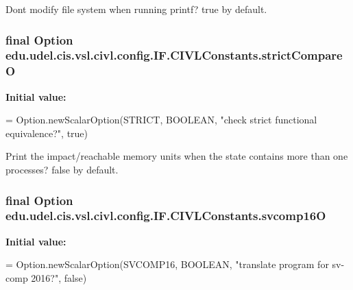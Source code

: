 Don\textquotesingle{}t modify file system when running printf? true by default. 

\hypertarget{classedu_1_1udel_1_1cis_1_1vsl_1_1civl_1_1config_1_1IF_1_1CIVLConstants_add91532d6eb02876e1facf863c65b8a5}{}
\subsubsection[{strict\+Compare\+O}]{\setlength{\rightskip}{0pt plus 5cm}final Option edu.\+udel.\+cis.\+vsl.\+civl.\+config.\+I\+F.\+C\+I\+V\+L\+Constants.\+strict\+Compare\+O\hspace{0.3cm}{\ttfamily [static]}}\label{classedu_1_1udel_1_1cis_1_1vsl_1_1civl_1_1config_1_1IF_1_1CIVLConstants_add91532d6eb02876e1facf863c65b8a5}
{\bfseries Initial value\+:}
\begin{DoxyCode}
= Option.newScalarOption(STRICT,
            BOOLEAN, \textcolor{stringliteral}{"check strict functional equivalence?"}, \textcolor{keyword}{true})
\end{DoxyCode}


Print the impact/reachable memory units when the state contains more than one processes? false by default. 

\hypertarget{classedu_1_1udel_1_1cis_1_1vsl_1_1civl_1_1config_1_1IF_1_1CIVLConstants_a5c03b5fbc54ce2a72f6a111b44d9f7db}{}
\subsubsection[{svcomp16\+O}]{\setlength{\rightskip}{0pt plus 5cm}final Option edu.\+udel.\+cis.\+vsl.\+civl.\+config.\+I\+F.\+C\+I\+V\+L\+Constants.\+svcomp16\+O\hspace{0.3cm}{\ttfamily [static]}}\label{classedu_1_1udel_1_1cis_1_1vsl_1_1civl_1_1config_1_1IF_1_1CIVLConstants_a5c03b5fbc54ce2a72f6a111b44d9f7db}
{\bfseries Initial value\+:}
\begin{DoxyCode}
= Option.newScalarOption(SVCOMP16,
            BOOLEAN, \textcolor{stringliteral}{"translate program for sv-comp 2016?"}, \textcolor{keyword}{false})
\end{DoxyCode}


